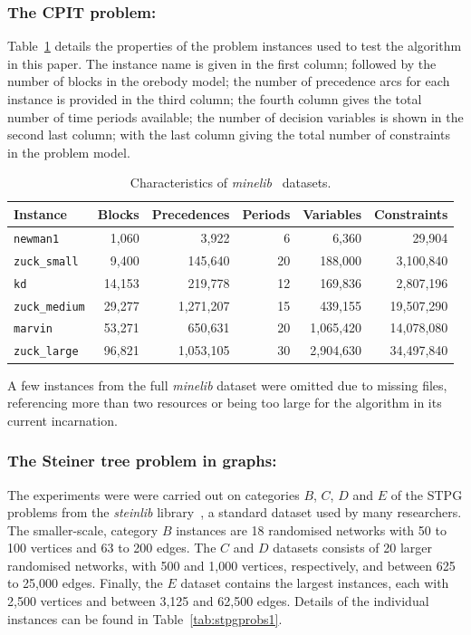 \documentclass[authoryear,11pt,square,number,times,super,comma]{elsarticle}
\begin{document}
\subsubsection*{The CPIT problem:}
Table~\ref{tab:datasets} details the properties of the problem instances used to test the algorithm in this paper. The instance name is given in the first column; followed by the number of blocks in the orebody model; the number of precedence arcs for each instance is provided in the third column; the fourth column gives the total number of time periods available; the number of decision variables is shown in the second last column; with the last column giving the total number of constraints in the problem model.\par
%
\begin{table}[h!]
\centering
\caption{Characteristics of \emph{minelib}~\citep{espinoza_minelib:_2012} datasets.}\label{tab:datasets}
\begin{tabular}{lrrrrr} \toprule
Instance & Blocks & Precedences & Periods & Variables & Constraints\\
\hline
\texttt{newman1} & 1,060 & 3,922 & 6 & 6,360 & 29,904\\
\texttt{zuck\_small} & 9,400 & 145,640 & 20 & 188,000 & 3,100,840\\
\texttt{kd} & 14,153 & 219,778 & 12 & 169,836 & 2,807,196\\
\texttt{zuck\_medium} & 29,277 & 1,271,207 & 15 & 439,155 & 19,507,290\\
\texttt{marvin} & 53,271 & 650,631 & 20 & 1,065,420 & 14,078,080\\
\texttt{zuck\_large} & 96,821 & 1,053,105 & 30 & 2,904,630 & 34,497,840\\
\bottomrule
\end{tabular}
\end{table}
%
A few instances from the full \emph{minelib} dataset were omitted due to missing files, referencing more than two resources or being too large for the algorithm in its current incarnation.

\subsubsection*{The Steiner tree problem in graphs:}

The experiments were were carried out on categories $B$, $C$, $D$ and $E$ of the STPG problems from the \textit{steinlib} library~\citep{steinlib}, a standard dataset used by many researchers. The smaller-scale, category $B$ instances are 18 randomised networks with 50 to 100 vertices and 63 to 200 edges. The $C$ and $D$ datasets consists of 20 larger randomised networks, with 500 and 1,000 vertices, respectively, and between 625 to 25,000 edges. Finally, the $E$ dataset contains the largest instances, each with 2,500 vertices and between 3,125 and 62,500 edges. Details of the individual instances can be found in Table~\ref{tab:stpgprobs1}. 
\end{document}
